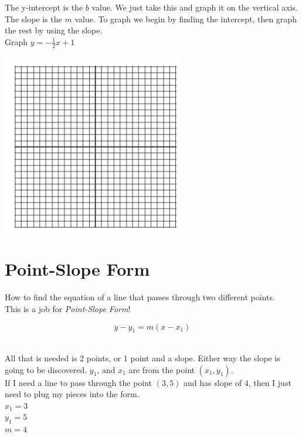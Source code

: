 \documentclass[12pt]{article}
\begin{document}
The y-intercept is the $b$ value. We just take this and graph it on the vertical axis. The slope is the $m$ value. To graph we begin by finding the intercept, then graph the rest by using the slope.\\

Graph $y=-\frac{1}{2}x+1$

\begin{center}
\includegraphics[scale=1]{graph.jpg}
\end{center}


\pagebreak

\section*{Point-Slope Form}

How to find the equation of a line that passes through two different points.\\

This is a job for \textit{Point-Slope Form}!\\

\begin{Large}
$$y-y_1=m(x-x_1)$$\\
\end{Large}

All that is needed is 2 points, or 1 point and a slope. Either way the slope is going to be discovered. $y_1$, and $x_1$ are from the point $(x_1,y_1)$. \\

If I need a line to pass through the point $(3,5)$ and has slope of $4$, then I just need to plug my pieces into the form.\\

$x_1=3$\\
$y_1=5$\\
$m=4$\\
\end{document}
